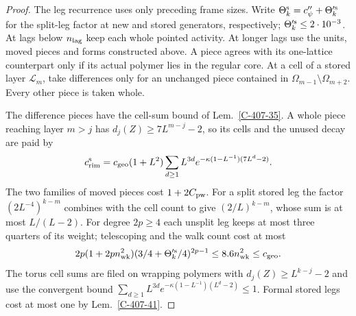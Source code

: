 \documentclass[11pt,letterpaper,reqno]{amsart}
\theoremstyle{definition}
\theoremstyle{remark}
\begin{document}
\begin{proof}
The leg recurrence uses only preceding frame sizes. Write
$\Theta_k^{\rm s}=c''_\psi+\Theta_k^{\prime\rm s}$ for the
split-leg factor at new and stored generators, respectively;
$\Theta_k^{\prime\rm s}\le2\cdot10^{-3}$. At lags below
$n_{\rm lag}$ keep each whole pointed activity. At longer
lags use the units, moved pieces and forms constructed above.
A piece agrees with its one-lattice counterpart only if its
actual polymer lies in the regular core. At a cell of a
stored layer $\mathcal L_m$, take differences only for an
unchanged piece contained in $\Omega_{m-1}\setminus\Omega_{m+2}$.
Every other piece is taken whole.

The difference pieces have the cell-sum bound of
Lem.~\ref{C-407-35}. A whole piece reaching layer $m>j$ has
$d_j(Z)\ge7L^{m-j}-2$, so its cells and the unused decay are
paid by
\[
 c_{\rm rim}^{\rm s}=c_{\rm geo}(1+L^2)
       \sum_{d\ge1}L^{3d}e^{-\kappa(1-L^{-1})(7L^d-2)}.
\]
The two families of moved pieces cost $1+2C_{\rm pw}$.
For a split stored leg the factor $(2L^{-4})^{k-m}$ combines
with the cell count to give $(2/L)^{k-m}$, whose sum is at
most $L/(L-2)$. For degree $2p\ge4$ each unsplit leg keeps
at most three quarters of its weight; telescoping and the
walk count cost at most
\[
 2p(1+2pn_{\rm wk}^2)
      (3/4+\Theta_k^{\prime\rm s}/4)^{2p-1}
       \le8.6n_{\rm wk}^2\le c_{\rm geo}.
\]
The torus cell sums are filed on wrapping polymers with
$d_j(Z)\ge L^{k-j}-2$ and use the convergent bound
$\sum_{d\ge1}L^{3d}e^{-\kappa(1-L^{-1})(L^d-2)}\le1$.
Formal stored legs cost at most one by Lem.~\ref{C-407-41}.


\end{proof}
\end{document}
